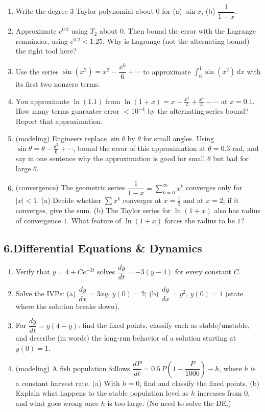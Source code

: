 \documentclass[11pt]{article}
\begin{document}
\begin{enumerate}[leftmargin=2em, itemsep=0.7em, start=20]
\item Write the degree-3 Taylor polynomial about $0$ for (a) $\sin x$, (b) $\dfrac{1}{1-x}$.
\item Approximate $e^{0.2}$ using $T_2$ about $0$. Then bound the error with the Lagrange remainder, using $e^{0.2}<1.25$. Why is Lagrange (not the alternating bound) the right tool here?
\item Use the series $\sin(x^2)=x^2 - \dfrac{x^6}{6}+\cdots$ to approximate $\displaystyle\int_0^1 \sin(x^2)\,dx$ with its first two nonzero terms.
\item You approximate $\ln(1.1)$ from $\ln(1+x)=x-\frac{x^2}{2}+\frac{x^3}{3}-\cdots$ at $x=0.1$. How many terms guarantee error $<10^{-4}$ by the alternating-series bound? Report that approximation.
\item (modeling) Engineers replace $\sin\theta$ by $\theta$ for small angles. Using $\sin\theta=\theta-\frac{\theta^3}{6}+\cdots$, bound the error of this approximation at $\theta=0.3$ rad, and say in one sentence why the approximation is good for small $\theta$ but bad for large $\theta$.
\item (convergence) The geometric series $\dfrac{1}{1-x}=\sum_{k=0}^\infty x^k$ converges only for $|x|<1$. (a) Decide whether $\sum x^k$ converges at $x=\tfrac12$ and at $x=2$; if it converges, give the sum. (b) The Taylor series for $\ln(1+x)$ also has radius of convergence $1$. What feature of $\ln(1+x)$ forces the radius to be $1$?
\end{enumerate}

\subsection*{6.\quad Differential Equations \& Dynamics}

\begin{enumerate}[leftmargin=2em, itemsep=0.7em, start=26]
\item Verify that $y=4 + Ce^{-3t}$ solves $\dfrac{dy}{dt}=-3(y-4)$ for every constant $C$.
\item Solve the IVPs: (a) $\dfrac{dy}{dx}=3xy$, $y(0)=2$; \;(b) $\dfrac{dy}{dx}=y^2$, $y(0)=1$ (state where the solution breaks down).
\item For $\dfrac{dy}{dt}=y(4-y)$: find the fixed points, classify each as stable/unstable, and describe (in words) the long-run behavior of a solution starting at $y(0)=1$.
\item (modeling) A fish population follows $\dfrac{dP}{dt}=0.5\,P\left(1-\dfrac{P}{1000}\right) - h$, where $h$ is a constant harvest rate. (a) With $h=0$, find and classify the fixed points. (b) Explain what happens to the stable population level as $h$ increases from $0$, and what goes wrong once $h$ is too large. (No need to solve the DE.)
\end{enumerate}
\end{document}
